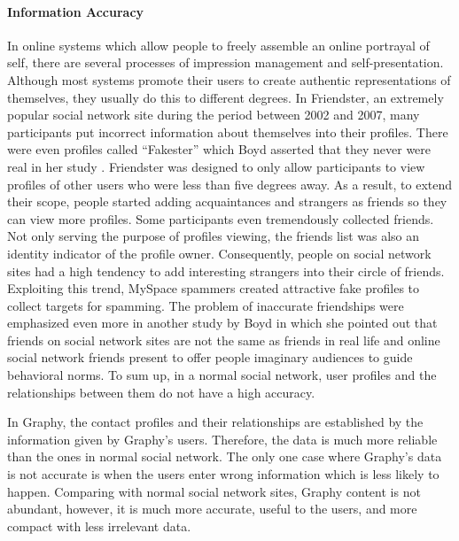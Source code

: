 \paragraph{Information Accuracy}
In online systems which allow people to freely assemble an online portrayal of self, there are several processes of impression management and self-presentation. Although most systems promote their users to create authentic representations of themselves, they usually do this to different degrees. In Friendster, an extremely popular social network site during the period between 2002 and 2007, many participants put incorrect information about themselves into their profiles. There were even profiles called ``Fakester'' which Boyd asserted that they never were real in her study \cite{boyd2010social}. Friendster was designed to only allow participants to view profiles of other users who were less than five degrees away. As a result, to extend their scope, people started adding acquaintances and strangers as friends so they can view more profiles. Some participants even tremendously collected friends. Not only serving the purpose of profiles viewing, the friends list was also an identity indicator of the profile owner. Consequently, people on social network sites had a high tendency to add interesting strangers into their circle of friends. Exploiting this trend, MySpace spammers created attractive fake profiles to collect targets for spamming. The problem of inaccurate friendships were emphasized even more in another study by Boyd \cite{boyd2006friends} in which she pointed out that friends on social network sites are not the same as friends in real life and online social network friends present to offer people imaginary audiences to guide behavioral norms. To sum up, in a normal social network, user profiles and the relationships between them do not have a high accuracy.

In Graphy, the contact profiles and their relationships are established by the information given by Graphy's users. Therefore, the data is much more reliable than the ones in normal social network. The only one case where Graphy's data is not accurate is when the users enter wrong information which is less likely to happen. Comparing with normal social network sites, Graphy content is not abundant, however, it is much more accurate, useful to the users, and more compact with less irrelevant data.

